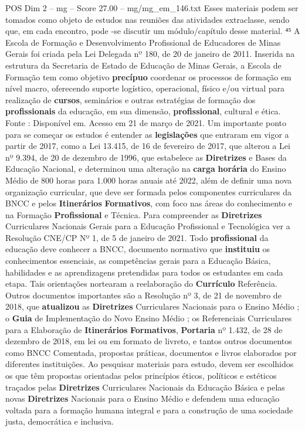 \begin{textsample}{POS Dim 2 – mg – Score 27.00 – mg/mg\_em\_146.txt}
Esses materiais podem ser tomados como objeto de estudos nas reuniões das atividades extraclasse, sendo que, em cada encontro, pode -se discutir um módulo/capítulo desse material. ⁴⁵ A Escola de Formação e Desenvolvimento Profissional de Educadores de Minas Gerais foi criada pela Lei Delegada nº 180, de 20 de janeiro de 2011.
Inserida na estrutura da Secretaria de Estado de Educação de Minas Gerais, a Escola de Formação tem como objetivo \textbf{precípuo} coordenar os processos de formação em nível macro, oferecendo suporte logístico, operacional, físico e/ou virtual para realização de \textbf{cursos}, seminários e outras estratégias de formação dos \textbf{profissionais} da educação, em sua dimensão, \textbf{profissional}, cultural e ética.
Fonte : Disponível em.
Acesso em 21 de março de 2021.
Um importante ponto para se começar os estudos é entender as \textbf{legislações} que entraram em vigor a partir de 2017, como a Lei 13.415, de 16 de fevereiro de 2017, que alterou a Lei nº 9.394, de 20 de dezembro de 1996, que estabelece as \textbf{Diretrizes} e Bases da Educação Nacional, e determinou uma alteração na \textbf{carga} \textbf{horária} do Ensino Médio de 800 horas para 1.000 horas anuais até 2022, além de definir uma nova organização curricular, que deve ser formada pelos componentes curriculares da BNCC e pelos \textbf{Itinerários} \textbf{Formativos}, com foco nas áreas do conhecimento e na Formação \textbf{Profissional} e Técnica.
Para compreender as \textbf{Diretrizes} Curriculares Nacionais Gerais para a Educação Profissional e Tecnológica ver a Resolução CNE/CP Nº 1, de 5 de janeiro de 2021.
Todo \textbf{profissional} da educação deve conhecer a BNCC, documento normativo que \textbf{instituiu} os conhecimentos essenciais, as competências gerais para a Educação Básica, habilidades e as aprendizagens pretendidas para todos os estudantes em cada etapa.
Tais orientações nortearam a reelaboração do \textbf{Currículo} Referência.
Outros documentos importantes são a Resolução nº 3, de 21 de novembro de 2018, que \textbf{atualizou} as \textbf{Diretrizes} Curriculares Nacionais para o Ensino Médio ; o \textbf{Guia} de Implementação do Novo Ensino Médio ; os Referenciais Curriculares para a Elaboração de \textbf{Itinerários} \textbf{Formativos}, \textbf{Portaria} nº 1.432, de 28 de dezembro de 2018, em lei ou em formato de livreto, e tantos outros documentos como BNCC Comentada, propostas práticas, documentos e livros elaborados por diferentes instituições.
Ao pesquisar materiais para estudo, devem ser escolhidos os que têm propostas orientadas pelos princípios éticos, políticos e estéticos traçados pelas \textbf{Diretrizes} Curriculares Nacionais da Educação Básica e pelas novas \textbf{Diretrizes} Nacionais para o Ensino Médio e defendem uma educação voltada para a formação humana integral e para a construção de uma sociedade justa, democrática e inclusiva.

\end{textsample}
